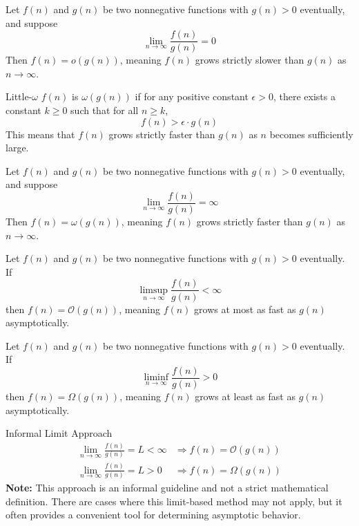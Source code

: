 \begin{proposition}
    Let \( f(n) \) and \( g(n) \) be two nonnegative functions with $g(n)>0$ eventually, and suppose
    \medskip
    \[
    \lim_{n \rightarrow \infty} \frac{f(n)}{g(n)} = 0
    \]
    \medskip
    Then \( f(n) = o(g(n)) \), meaning \( f(n) \) grows strictly slower than \( g(n) \) as \( n \to \infty \).
\end{proposition}

\begin{definition}{Little-$\omega$}
    $f(n)$ is $\omega(g(n))$ if for any positive constant $\epsilon > 0$, there exists a constant $k \geq 0$ such that for all $n \geq k$,
    \medskip
    \[
    f(n) > \epsilon \cdot g(n)
    \]
    \medskip
    This means that $f(n)$ grows strictly faster than $g(n)$ as $n$ becomes sufficiently large.
\end{definition}

\begin{proposition}
    Let \( f(n) \) and \( g(n) \) be two nonnegative functions with $g(n)>0$ eventually, and suppose
    \medskip
    \[
    \lim_{n \rightarrow \infty} \frac{f(n)}{g(n)} = \infty
    \]
    \medskip
    Then \( f(n) = \omega(g(n)) \), meaning \( f(n) \) grows strictly faster than \( g(n) \) as \( n \to \infty \).
\end{proposition}

        \begin{proposition}
            Let \( f(n) \) and \( g(n) \) be two nonnegative functions with $g(n)>0$ eventually. If
            \medskip
            \[
            \limsup_{n \rightarrow \infty} \frac{f(n)}{g(n)} < \infty
            \]
            \medskip
            then \( f(n) = \mathcal{O}(g(n)) \), meaning \( f(n) \) grows at most as fast as \( g(n) \) asymptotically.
        \end{proposition}

        \begin{proposition}
            Let \( f(n) \) and \( g(n) \) be two nonnegative functions with $g(n)>0$ eventually. If
            \medskip
            \[
            \liminf_{n \rightarrow \infty} \frac{f(n)}{g(n)} > 0
            \]
            \medskip
            then \( f(n) = \Omega(g(n)) \), meaning \( f(n) \) grows at least as fast as \( g(n) \) asymptotically.
        \end{proposition}

        \begin{custombox}{Informal Limit Approach}
            \[
                \begin{array}{ll}
                \displaystyle \lim_{n \to \infty} \frac{f(n)}{g(n)} = L<\infty & \Rightarrow f(n) = \mathcal{O}(g(n)) \\[10pt]
                \displaystyle \lim_{n \to \infty} \frac{f(n)}{g(n)} = L>0 & \Rightarrow f(n) = \Omega(g(n))
                \end{array}
                \]
                \medskip
                \textbf{Note:} This approach is an informal guideline and not a strict mathematical definition. There are cases where this limit-based method may not apply, but it often provides a convenient tool for determining asymptotic behavior.
        \end{custombox}
